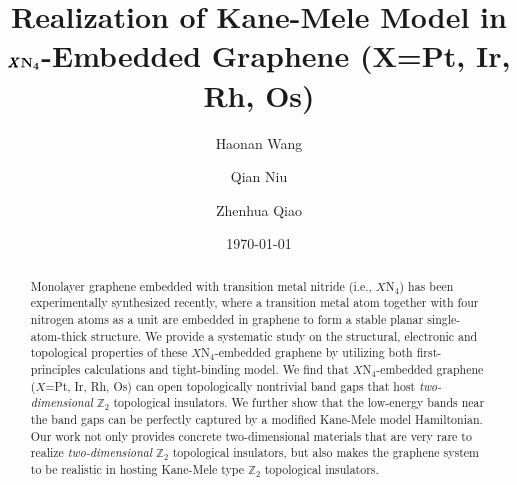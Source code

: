 \documentclass[aps,prl,twocolumn,showpacs,superscriptaddress]{revtex4-1}
\begin{document}
\title{Realization of Kane-Mele Model in $\pmb X\bf{N_4}$-Embedded Graphene ($\pmb X$=Pt, Ir, Rh, Os)}
\author{Haonan Wang}
\author{Qian Niu}%
\author{Zhenhua Qiao}%
\date{\today}

\begin{abstract}
  Monolayer graphene embedded with transition metal nitride (i.e., $X$N$_4$) has been experimentally synthesized recently, where a transition metal atom together with four nitrogen atoms as a unit are embedded in graphene to form a stable planar single-atom-thick structure. We provide a systematic study on the structural, electronic and topological properties of these $X$N$_4$-embedded graphene by utilizing both first-principles calculations and tight-binding model. We find that $X$N$_4$-embedded graphene ($X$=Pt, Ir, Rh, Os) can open topologically nontrivial band gaps that host \emph{two-dimensional} $\mathbb{Z}_2$ topological insulators. We further show that the low-energy bands near the band gaps can be perfectly captured by a modified Kane-Mele model Hamiltonian. Our work not only provides concrete two-dimensional materials that are very rare to realize \emph{two-dimensional} $\mathbb{Z}_2$ topological insulators, but also makes the graphene system to be realistic in hosting Kane-Mele type $\mathbb{Z}_2$ topological insulators.
\end{abstract}
\end{document}
